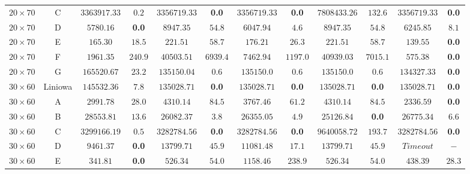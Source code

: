 \begin{table}[H]
\begin{center}
{\begin{tabular}{c|c||c|c||c|c||c|c||c|c||c|c}
            $20 \times 70$ & C           & $3363917.33$ & $0.2$                  & $3356719.33$ & \textbf{0.0}       & $3356719.33$ & \textbf{0.0}      & $7808433.26$ & $132.6$    & $3356719.33$ & \textbf{0.0} \\
            $20 \times 70$ & D           & $5780.16$ & \textbf{0.0}                    & $8947.35$ & $54.8$         & $6047.94$ & $4.6$         & $8947.35$ & $54.8$        & $6245.85$ & $8.1$ \\
            $20 \times 70$ & E           & $165.30$ & $18.5$                      & $221.51$ & $58.7$          & $176.21$ & $26.3$         & $221.51$ & $58.7$         & $139.55$ & \textbf{0.0} \\
            $20 \times 70$ & F           & $1961.35$ & $240.9$                   & $40503.51$ & $6939.4$      & $7462.94$ & $1197.0$      & $40939.03$ & $7015.1$     & $575.38$ & \textbf{0.0} \\
            $20 \times 70$ & G           & $165520.67$ & $23.2$                  & $135150.04$ & $0.6$        & $135150.0$ & $0.6$        & $135150.0$ & $0.6$        & $134327.33$ & \textbf{0.0} \\
            \hline
            $30 \times 60$ & Liniowa     & $145532.36$ & $7.8$                   & $135028.71$ & \textbf{0.0}        & $135028.71$ & \textbf{0.0}       & $135028.71$ & \textbf{0.0}       & $135028.71$ & \textbf{0.0} \\
            $30 \times 60$ & A           & $2991.78$ & $28.0$                    & $4310.14$ & $84.5$         & $3767.46$ & $61.2$        & $4310.14$ & $84.5$        & $2336.59$ & \textbf{0.0} \\
            $30 \times 60$ & B           & $28553.81$ & $13.6$                    & $26082.37$ & $3.8$         & $26355.05$ & $4.9$        & $25126.84$ & \textbf{0.0}        & $26775.34$ & $6.6$ \\
            $30 \times 60$ & C           & $3299166.19$ & $0.5$                  & $3282784.56$ & \textbf{0.0}       & $3282784.56$ & \textbf{0.0}      & $9640058.72$ & $193.7$    & $3282784.56$ & \textbf{0.0} \\
            $30 \times 60$ & D           & $9461.37$ & \textbf{0.0}                    & $13799.71$ & $45.9$        & $11081.48$ & $17.1$        & $13799.71$ & $45.9$       & $Time out$ & $-$ \\
            $30 \times 60$ & E           & $341.81$ & \textbf{0.0}                      & $526.34$ & $54.0$          & $1158.46$ & $238.9$       & $526.34$ & $54.0$         & $438.39$ & $28.3$ \\

\end{tabular}}
\end{center}
\end{table}
